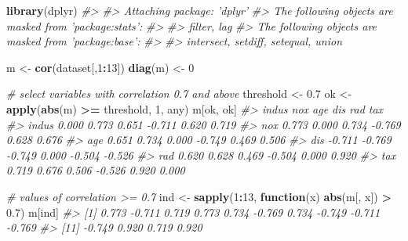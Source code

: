 \documentclass[]{book}
\newenvironment{Shaded}{\begin{snugshade}}{\end{snugshade}}
\newcommand{\CommentTok}[1]{\textcolor[rgb]{0.56,0.35,0.01}{\textit{#1}}}
\newcommand{\ControlFlowTok}[1]{\textcolor[rgb]{0.13,0.29,0.53}{\textbf{#1}}}
\newcommand{\DecValTok}[1]{\textcolor[rgb]{0.00,0.00,0.81}{#1}}
\newcommand{\FloatTok}[1]{\textcolor[rgb]{0.00,0.00,0.81}{#1}}
\newcommand{\KeywordTok}[1]{\textcolor[rgb]{0.13,0.29,0.53}{\textbf{#1}}}
\newcommand{\NormalTok}[1]{#1}
\newcommand{\OperatorTok}[1]{\textcolor[rgb]{0.81,0.36,0.00}{\textbf{#1}}}
\newcommand{\StringTok}[1]{\textcolor[rgb]{0.31,0.60,0.02}{#1}}
\begin{document}
\begin{Shaded}
\begin{Highlighting}[]
\KeywordTok{library}\NormalTok{(dplyr)}
\CommentTok{#> }
\CommentTok{#> Attaching package: 'dplyr'}
\CommentTok{#> The following objects are masked from 'package:stats':}
\CommentTok{#> }
\CommentTok{#>     filter, lag}
\CommentTok{#> The following objects are masked from 'package:base':}
\CommentTok{#> }
\CommentTok{#>     intersect, setdiff, setequal, union}

\NormalTok{m <-}\StringTok{ }\KeywordTok{cor}\NormalTok{(dataset[,}\DecValTok{1}\OperatorTok{:}\DecValTok{13}\NormalTok{])}
\KeywordTok{diag}\NormalTok{(m) <-}\StringTok{ }\DecValTok{0}
\end{Highlighting}
\end{Shaded}

\begin{Shaded}
\begin{Highlighting}[]
\CommentTok{# select variables with correlation 0.7 and above}
\NormalTok{threshold <-}\StringTok{ }\FloatTok{0.7}
\NormalTok{ok <-}\StringTok{ }\KeywordTok{apply}\NormalTok{(}\KeywordTok{abs}\NormalTok{(m) }\OperatorTok{>=}\StringTok{ }\NormalTok{threshold, }\DecValTok{1}\NormalTok{, any)}
\NormalTok{m[ok, ok]}
\CommentTok{#>        indus    nox    age    dis    rad    tax}
\CommentTok{#> indus  0.000  0.773  0.651 -0.711  0.620  0.719}
\CommentTok{#> nox    0.773  0.000  0.734 -0.769  0.628  0.676}
\CommentTok{#> age    0.651  0.734  0.000 -0.749  0.469  0.506}
\CommentTok{#> dis   -0.711 -0.769 -0.749  0.000 -0.504 -0.526}
\CommentTok{#> rad    0.620  0.628  0.469 -0.504  0.000  0.920}
\CommentTok{#> tax    0.719  0.676  0.506 -0.526  0.920  0.000}
\end{Highlighting}
\end{Shaded}

\begin{Shaded}
\begin{Highlighting}[]
\CommentTok{# values of correlation >= 0.7}
\NormalTok{ind <-}\StringTok{ }\KeywordTok{sapply}\NormalTok{(}\DecValTok{1}\OperatorTok{:}\DecValTok{13}\NormalTok{, }\ControlFlowTok{function}\NormalTok{(x) }\KeywordTok{abs}\NormalTok{(m[, x]) }\OperatorTok{>}\StringTok{ }\FloatTok{0.7}\NormalTok{)}
\NormalTok{m[ind]}
\CommentTok{#>  [1]  0.773 -0.711  0.719  0.773  0.734 -0.769  0.734 -0.749 -0.711 -0.769}
\CommentTok{#> [11] -0.749  0.920  0.719  0.920}
\end{Highlighting}
\end{Shaded}
\end{document}
